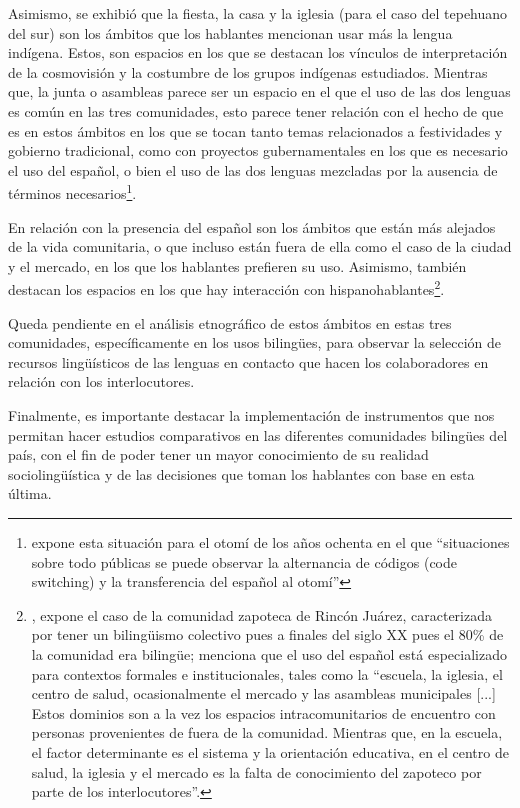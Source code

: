 \documentclass[output=paper]{../langscibook}
\begin{document}
  Asimismo, se exhibió que la fiesta, la casa y la iglesia (para el caso del tepehuano del sur) son los ámbitos que los hablantes mencionan usar más la lengua indígena. Estos, son espacios en los que se destacan los vínculos de interpretación de la cosmovisión y la costumbre de los grupos indígenas estudiados. Mientras que, la junta o asambleas parece ser un espacio en el que el uso de las dos lenguas es común en las tres comunidades, esto parece tener relación con el hecho de que es en estos ámbitos en los que se tocan tanto temas relacionados a festividades y gobierno tradicional, como con proyectos gubernamentales en los que es necesario el uso del español, o bien el uso de las dos lenguas mezcladas por la ausencia de términos necesarios\footnote{\citet[922]{Zimmermann2010} expone esta situación para el otomí de los años ochenta en el que “situaciones sobre todo públicas se puede observar la alternancia de códigos (code switching) y la transferencia del español al otomí”}.

En relación con la presencia del español son los ámbitos que están más alejados de la vida comunitaria, o que incluso están fuera de ella como el caso de la ciudad y el mercado, en los que los hablantes prefieren su uso. Asimismo, también destacan los espacios en los que hay interacción con hispanohablantes\footnote{\citet[928]{Zimmermann2010}, expone el caso de la comunidad zapoteca de Rincón Juárez, caracterizada por tener un bilingüismo colectivo pues a finales del siglo XX pues el 80\% de la comunidad era bilingüe; menciona que el uso del español está especializado para contextos formales e institucionales, tales como la “escuela, la iglesia, el centro de salud, ocasionalmente el mercado y las asambleas municipales [...] Estos dominios son a la vez los espacios intracomunitarios de encuentro con personas provenientes de fuera de la comunidad. Mientras que, en la escuela, el factor determinante es el sistema y la orientación educativa, en el centro de salud, la iglesia y el mercado es la falta de conocimiento del zapoteco por parte de los interlocutores”.}.

Queda pendiente en el análisis etnográfico de estos ámbitos en estas tres comunidades, específicamente en los usos bilingües, para observar la selección de recursos lingüísticos de las lenguas en contacto que hacen los colaboradores en relación con los interlocutores.

  Finalmente, es importante destacar la implementación de instrumentos que nos permitan hacer estudios comparativos en las diferentes comunidades bilingües del país, con el fin de poder tener un mayor conocimiento de su realidad sociolingüística y de las decisiones que toman los hablantes con base en esta última.
\end{document}
